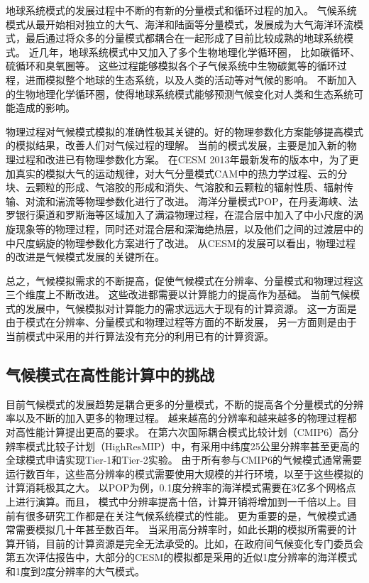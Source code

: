 地球系统模式的发展过程中不断的有新的分量模式和循环过程的加入。
气候系统模式从最开始相对独立的大气、海洋和陆面等分量模式，发展成为大气海洋环流模式，最后通过将众多的分量模式都耦合在一起形成了目前比较成熟的地球系统模式。
近几年，地球系统模式中又加入了多个生物地理化学循环圈， 比如碳循环、硫循环和臭氧圈等\cite{stocker2013ipcc}。
这些过程能够模拟各个子气候系统中生物碳氮等的循环过程，进而模拟整个地球的生态系统，以及人类的活动等对气候的影响。
不断加入的生物地理化学循环圈，使得地球系统模式能够预测气候变化对人类和生态系统可能造成的影响。

物理过程对气候模式模拟的准确性极其关键的。好的物理参数化方案能够提高模式的模拟结果，改善人们对气候过程的理解。
当前的模式发展，主要是加入新的物理过程和改进已有物理参数化方案。 
在CESM 2013年最新发布的版本\cite{hurrell2013community}中，为了更加真实的模拟大气的运动规律，对大气分量模式CAM中的热力学过程、云的分块、云颗粒的形成、气溶胶的形成和消失、气溶胶和云颗粒的辐射性质、辐射传输、对流和湍流等物理参数化进行了改进。
海洋分量模式POP，在丹麦海峡、法罗银行渠道和罗斯海等区域加入了满溢物理过程，在混合层中加入了中小尺度的涡旋现象等的物理过程，同时还对混合层和深海绝热层，以及他们之间的过渡层中的中尺度蜗旋的物理参数化方案进行了改进。
从CESM的发展可以看出，物理过程的改进是气候模式发展的关键所在。
 
总之，气候模拟需求的不断提高，促使气候模式在分辨率、分量模式和物理过程这三个维度上不断改进。
这些改进都需要以计算能力的提高作为基础。
当前气候模式的发展中，气候模拟对计算能力的需求远远大于现有的计算资源\cite{dennis2012computational}。
这一方面是由于模式在分辨率、分量模式和物理过程等方面的不断发展，
另一方面则是由于当前模式中采用的并行算法没有充分的利用已有的计算资源。


\subsection{气候模式在高性能计算中的挑战}

目前气候模式的发展趋势是耦合更多的分量模式，不断的提高各个分量模式的分辨率以及不断的加入更多的物理过程\cite{stocker2013ipcc}。
越来越高的分辨率和越来越多的物理过程都对高性能计算提出更高的要求。 
在第六次国际耦合模式比较计划（CMIP6）高分辨率模式比较子计划（HighResMIP）中，有采用中纬度25公里分辨率甚至更高的全球模式申请实现Tier-1和Tier-2实验。 
由于所有参与CMIP6的气候模式通常需要运行数百年，这些高分辨率的模式需要使用大规模的并行环境，以至于这些模拟的计算消耗极其之大。
以POP为例，0.1度分辨率的海洋模式需要在3亿多个网格点上进行演算。而且，
模式中分辨率提高十倍，计算开销将增加到一千倍以上。目前有很多研究工作都是在关注气候系统模式的性能\cite{Worley:2011:PCE:2063384.2063457,dennis2012computational}。 
更为重要的是，气候模式通常需要模拟几十年甚至数百年。
当采用高分辨率时，如此长期的模拟所需要的计算开销，目前的计算资源是完全无法承受的。比如，在政府间气候变化专门委员会第五次评估报告中，大部分的CESM的模拟都是采用的近似1度分辨率的海洋模式和1度到2度分辨率的大气模式。



